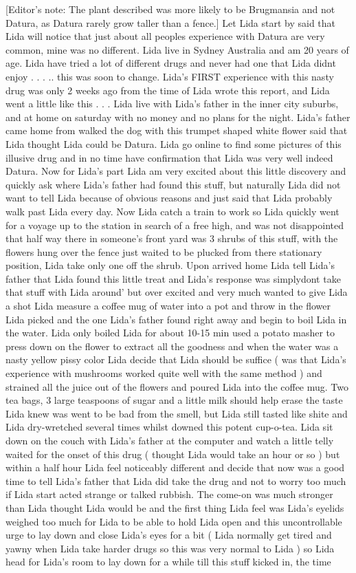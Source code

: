 \documentclass[12pt]{book}
\begin{document}
[Editor's note: The plant described was more likely to be Brugmansia and not Datura, as Datura rarely grow taller than a fence.] Let Lida start by said that Lida will notice that just about all peoples experience with Datura are very common, mine was no different. Lida live in Sydney Australia and am 20 years of age. Lida have tried a lot of different drugs and never had one that Lida didnt enjoy . . . .. this was soon to change. Lida's FIRST experience with this nasty drug was only 2 weeks ago from the time of Lida wrote this report, and Lida went a little like this . . .  Lida live with Lida's father in the inner city suburbs, and at home on saturday with no money and no plans for the night. Lida's father came home from walked the dog with this trumpet shaped white flower said that Lida thought Lida could be Datura. Lida go online to find some pictures of this illusive drug and in no time have confirmation that Lida was very well indeed Datura. Now for Lida's part Lida am very excited about this little discovery and quickly ask where Lida's father had found this stuff, but naturally Lida did not want to tell Lida because of obvious reasons and just said that Lida probably walk past Lida every day. Now Lida catch a train to work so Lida quickly went for a voyage up to the station in search of a free high, and was not disappointed that half way there in someone's front yard was 3 shrubs of this stuff, with the flowers hung over the fence just waited to be plucked from there stationary position, Lida take only one off the shrub. Upon arrived home Lida tell Lida's father that Lida found this little treat and Lida's response was simplydont take that stuff with Lida around' but over excited and very much wanted to give Lida a shot Lida measure a coffee mug of water into a pot and throw in the flower Lida picked and the one Lida's father found right away and begin to boil Lida in the water. Lida only boiled Lida for about 10-15 min used a potato masher to press down on the flower to extract all the goodness and when the water was a nasty yellow pissy color Lida decide that Lida should be suffice ( was that Lida's experience with mushrooms worked quite well with the same method ) and strained all the juice out of the flowers and poured Lida into the coffee mug. Two tea bags, 3 large teaspoons of sugar and a little milk should help erase the taste Lida knew was went to be bad from the smell, but Lida still tasted like shite and Lida dry-wretched several times whilst downed this potent cup-o-tea. Lida sit down on the couch with Lida's father at the computer and watch a little telly waited for the onset of this drug ( thought Lida would take an hour or so ) but within a half hour Lida feel noticeably different and decide that now was a good time to tell Lida's father that Lida did take the drug and not to worry too much if Lida start acted strange or talked rubbish. The come-on was much stronger than Lida thought Lida would be and the first thing Lida feel was Lida's eyelids weighed too much for Lida to be able to hold Lida open and this uncontrollable urge to lay down and close Lida's eyes for a bit ( Lida normally get tired and yawny when Lida take harder drugs so this was very normal to Lida ) so Lida head for Lida's room to lay down for a while till this stuff kicked in, the time 
\end{document}
